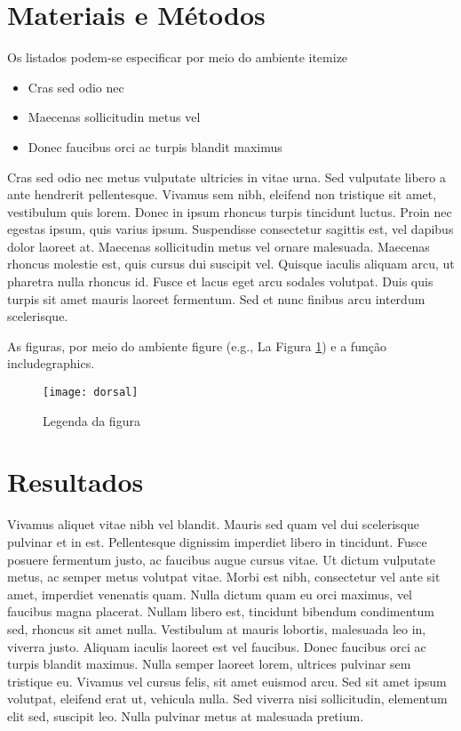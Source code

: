 \section{Materiais e Métodos}

Os listados podem-se especificar por meio do ambiente itemize

\begin{itemize}
  \item Cras sed odio nec
  \item Maecenas sollicitudin metus vel
  \item Donec faucibus orci ac turpis blandit maximus
\end{itemize}

Cras sed odio nec metus vulputate ultricies in vitae urna. Sed vulputate libero a ante hendrerit pellentesque. Vivamus sem nibh, eleifend non tristique sit amet, vestibulum quis lorem. Donec in ipsum rhoncus turpis tincidunt luctus. Proin nec egestas ipsum, quis varius ipsum. Suspendisse consectetur sagittis est, vel dapibus dolor laoreet at. Maecenas sollicitudin metus vel ornare malesuada. Maecenas rhoncus molestie est, quis cursus dui suscipit vel. Quisque iaculis aliquam arcu, ut pharetra nulla rhoncus id. Fusce et lacus eget arcu sodales volutpat. Duis quis turpis sit amet mauris laoreet fermentum. Sed et nunc finibus arcu interdum scelerisque.

As figuras, por meio do ambiente figure (e.g., La Figura \ref{fig:dorsal}) e a função includegraphics.

\begin{figure}
\centering
\texttt{[image: dorsal]}
\caption{Legenda da figura}
\label{fig:dorsal}
\end{figure}

\section{Resultados}

Vivamus aliquet vitae nibh vel blandit. Mauris sed quam vel dui scelerisque pulvinar et in est. Pellentesque dignissim imperdiet libero in tincidunt. Fusce posuere fermentum justo, ac faucibus augue cursus vitae. Ut dictum vulputate metus, ac semper metus volutpat vitae. Morbi est nibh, consectetur vel ante sit amet, imperdiet venenatis quam. Nulla dictum quam eu orci maximus, vel faucibus magna placerat. Nullam libero est, tincidunt bibendum condimentum sed, rhoncus sit amet nulla. Vestibulum at mauris lobortis, malesuada leo in, viverra justo. Aliquam iaculis laoreet est vel faucibus. Donec faucibus orci ac turpis blandit maximus. Nulla semper laoreet lorem, ultrices pulvinar sem tristique eu. Vivamus vel cursus felis, sit amet euismod arcu. Sed sit amet ipsum volutpat, eleifend erat ut, vehicula nulla. Sed viverra nisi sollicitudin, elementum elit sed, suscipit leo. Nulla pulvinar metus at malesuada pretium. 

